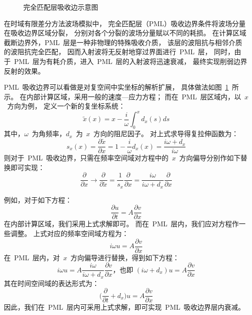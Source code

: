 \documentclass[UTF8]{ctexart}
\renewcommand{\cite}[1]{\textsuperscript{\textsuperscript{\citeleft\citen{#1}\citeright}}}          %
\begin{document}
\begin{figure}[h]
  \centering
  
  \caption{完全匹配层吸收边示意图}\label{fig:pml}
\end{figure}
在时域有限差分方法波场模拟中，
完全匹配层（PML）吸收边界条件将波场分量在吸收边界区域分裂，
分别对各个分裂的波场分量赋以不同的耗损。
在计算区域截断边界外，PML~层是一种非物理的特殊吸收介质，
该层的波阻抗与相邻介质的波阻抗完全匹配，
因而入射波将无反射地穿过界面进行~PML~层，
同时，由于~PML~层为有耗介质，进入~PML~层的入射波将迅速衰减，
最终实现削弱边界反射的效果。

PML~吸收边界可以看做是对复空间中实坐标的解析扩展，
具体做法如图~\ref{fig:pml}~所示。
在内部计算区域，采用一般的速度—应力方程；
而在~PML~层区域内，以~$x$~方向为例，
定义一个新的复坐标系统\cite{Komatitsch_2007}：
\[ \tilde{x}(x) = x - \frac{i}{\omega}\int_0^x d_x(s) ds \]
其中，$\omega$~为角频率，$d_x$~为~$x$~方向的阻尼因子。
对上式求导得复拉伸函数为：
\[ s_x(x) = \frac{\partial \tilde{x}}{\partial x} = 1 - \frac{i}{\omega} d_x(x) = \frac{i\omega + d_x}{i\omega} \]
则对于~PML~吸收边界，只需在频率空间域对方程中的~$x$~方向偏导分别作如下替换即可实现：
\[ \frac{\partial}{\partial x} \longrightarrow \frac{\partial}{\partial \tilde{x}} = \frac{1}{s_x} \frac{\partial}{\partial x} = \frac{i\omega}{i\omega+d_x}\frac{\partial}{\partial x} \]

例如，对于如下方程：
\[ \frac{\partial u}{\partial t}=A\frac{\partial v}{\partial x} \]
在内部计算区域，我们采用上式求解即可。
而在~PML~层内，我们应对方程作一些调整。
上式对应的频率空间域方程为：
\[ i\omega u=A\frac{\partial v}{\partial x} \]
在~PML~层内，对~$x$~方向偏导进行替换，得到如下方程：
\[ i\omega u=A\frac{i\omega}{i\omega+d_x}\frac{\partial v}{\partial x} \text{，也即~} (i\omega+d_x)u=A\frac{\partial v}{\partial x} \]
其在时间空间域的表达形式为：
\begin{equation}\label{eq:dpml}
\Big(\frac{\partial}{\partial t}+d_x\Big)u=A\frac{\partial v}{\partial x}
\end{equation}
因此，我们在~PML~层内可采用上式求解，即可实现~PML~吸收边界层内衰减。
\end{document}
